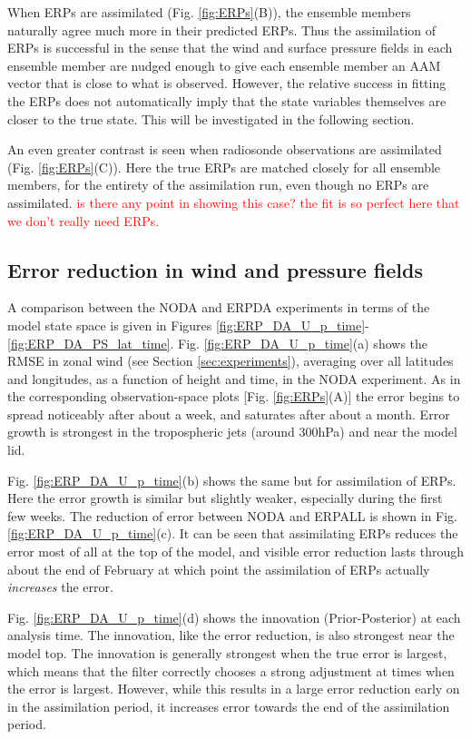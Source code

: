 \documentclass[draft,jgrga]{agutex}
\begin{document}
\begin{article}
When ERPs are assimilated (Fig. \ref{fig:ERPs}(B)), the ensemble members naturally agree much more in their predicted ERPs.  
Thus the assimilation of ERPs is successful in the sense that the wind and surface pressure fields in each ensemble member are nudged enough to give each ensemble member an AAM vector that is close to what is observed.
However, the relative success in fitting the ERPs does not automatically imply that the state variables themselves are closer to the true state.  
This will be investigated in the following section.

An even greater contrast is seen when radiosonde observations are assimilated (Fig. \ref{fig:ERPs}(C)).
Here the true ERPs are matched closely for all ensemble members, for the entirety of the assimilation run, even though no ERPs are assimilated.
\textcolor{red}{is there any point in showing this case?  the fit is so perfect here that we don't really need ERPs.}

\subsection{Error reduction in wind and pressure fields}

A comparison between the NODA and ERPDA experiments in terms of the model state space is given in Figures \ref{fig:ERP_DA_U_p_time}-\ref{fig:ERP_DA_PS_lat_time}.
Fig. \ref{fig:ERP_DA_U_p_time}(a) shows the RMSE in zonal wind (see Section \ref{sec:experiments}), averaging over all latitudes and longitudes, as a function of height and time, in the NODA experiment.
As in the corresponding observation-space plots [Fig. \ref{fig:ERPs}(A)] the error begins to spread noticeably after about a week, and saturates after about a month.
Error growth is strongest in the tropospheric jets (around 300hPa) and near the model lid.

Fig. \ref{fig:ERP_DA_U_p_time}(b) shows the same but for assimilation of ERPs.  
Here the error growth is similar but slightly weaker, especially during the first few weeks.
The reduction of error between NODA and ERPALL is shown in Fig. \ref{fig:ERP_DA_U_p_time}(c).
It can be seen that assimilating ERPs reduces the error most of all at the top of the model, and visible error reduction lasts through about the end of February at which point the assimilation of ERPs actually \textit{increases} the error.

Fig. \ref{fig:ERP_DA_U_p_time}(d) shows the innovation (Prior-Posterior) at each analysis time.
The innovation, like the error reduction, is also strongest near the model top.
The innovation is generally strongest when the true error is largest, which means that the filter correctly chooses a strong adjustment at times when the error is largest.
However, while this results in a large error reduction early on in the assimilation period, it increases error towards the end of the assimilation period.


\end{article}
\end{document}
